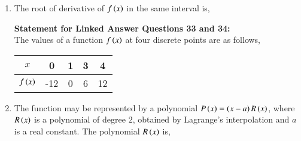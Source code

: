 \documentclass[journal]{IEEEtran}
\begin{document}
\begin{enumerate}
\begin{enumerate}
\end{enumerate}
\item The root of derivative of $f\left(x\right)$ in the same interval is,
\begin{enumerate}
\end{enumerate}
\textbf{Statement for Linked Answer Questions 33 and 34:}\\
The values of a function $f\left(x\right)$ at four discrete points are as follows,
\begin{table}[h!]
\centering
\begin{tabular}{|c|c|c|c|c|}
\hline
	$x$ & 0 & 1 & 3 & 4 \\ \hline
	$f\left(x\right)$ & -12 & 0 & 6 & 12\\ \hline
\end{tabular}
\end{table}
\item The function may be represented by a polynomial $P\left(x\right)=\left(x-a\right)R\left(x\right)$, where $R\left(x\right)$ is a polynomial of degree $2$, obtained by Lagrange's interpolation and $a$ is a real constant. The polynomial $R\left(x\right)$ is,
\begin{enumerate}
\end{enumerate}
\end{enumerate}
\end{document}
